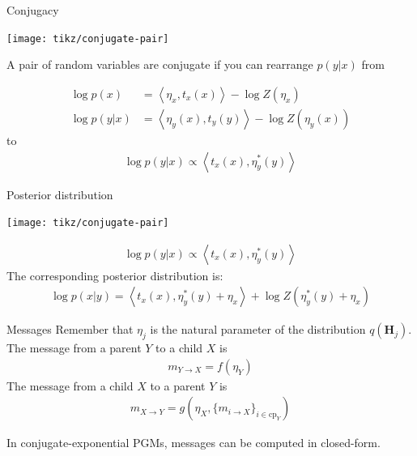 \documentclass[10pt, compress]{beamer}
\begin{document}
\begin{frame}{Conjugacy}
   \begin{center}
        \texttt{[image: tikz/conjugate-pair]}
   \end{center}
   A pair of random variables are conjugate if
   you can rearrange $p(y | x)$ from

  \pause

  \begin{align*}
    \log p(x) &= \left\langle\eta_x, t_x(x)\right\rangle - \log Z(\eta_x) \\
    \log p(y | x) &= \left\langle\eta_y(x), t_y(y)\right\rangle - \log Z(\eta_y(x))
  \end{align*}
  to
  \pause
  \begin{align*}
    \log p(y | x) \propto \left\langle t_x(x), \eta^*_y(y)\right\rangle
  \end{align*}
\end{frame}

\begin{frame}{Posterior distribution}
   \begin{center}
        \texttt{[image: tikz/conjugate-pair]}
   \end{center}
  \begin{align*}
    \log p(y | x) \propto \left\langle t_x(x), \eta^*_y(y)\right\rangle
  \end{align*}
  \pause
  The corresponding posterior distribution is:
  \begin{align*}
    \log p(x | y) = \left\langle t_x(x), \eta^*_y(y) + \eta_x\right\rangle + \log Z(\eta^*_y(y) + \eta_x)
  \end{align*}
  \pause
  \centering
\end{frame}

\begin{frame}{Messages}
  Remember that $\eta_j$ is the natural parameter of the distribution $q(\mathbf{H}_j)$.
  \pause
  The message from a parent $Y$ to a child $X$ is
  \begin{align*}
    m_{Y \rightarrow X} = f(\eta_Y)
  \end{align*}
  \pause
  The message from a child $X$ to a parent $Y$ is
  \begin{align*}
    m_{X \rightarrow Y} = g(\eta_X, \{m_{i \rightarrow X}\}_{i \in \textrm{cp}_Y})
  \end{align*}

  \pause
  In conjugate-exponential PGMs, messages can be computed in closed-form.
\end{frame}
\end{document}
